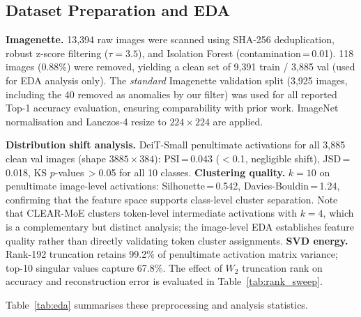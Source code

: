 \FloatBarrier
\subsection{Dataset Preparation and EDA}
\label{app:eda}

\textbf{Imagenette.} 13,394 raw images were scanned using SHA-256 deduplication, robust z-score filtering ($\tau{=}3.5$), and Isolation Forest (contamination\,=\,0.01). 118 images (0.88\%) were removed, yielding a clean set of 9,391 train / 3,885 val (used for EDA analysis only). The \emph{standard} Imagenette validation split (3,925 images, including the 40 removed as anomalies by our filter) was used for all reported Top-1 accuracy evaluation, ensuring comparability with prior work. ImageNet normalisation and Lanczos-4 resize to $224{\times}224$ are applied.

\textbf{Distribution shift analysis.} DeiT-Small penultimate activations for all 3,885 clean val images (shape $3885{\times}384$): PSI\,=\,0.043 ($<$0.1, negligible shift), JSD\,=\,0.018, KS $p$-values\,$>$0.05 for all 10 classes. \textbf{Clustering quality.} $k{=}10$ on penultimate image-level activations: Silhouette\,=\,0.542, Davies-Bouldin\,=\,1.24, confirming that the feature space supports class-level cluster separation. Note that CLEAR-MoE clusters token-level intermediate activations with $k{=}4$, which is a complementary but distinct analysis; the image-level EDA establishes feature quality rather than directly validating token cluster assignments. \textbf{SVD energy.} Rank-192 truncation retains 99.2\% of penultimate activation matrix variance; top-10 singular values capture 67.8\%. The effect of $W_2$ truncation rank on accuracy and reconstruction error is evaluated in Table~\ref{tab:rank_sweep}.

Table~\ref{tab:eda} summarises these preprocessing and analysis statistics.

\begin{table}[H]
\caption{Dataset preprocessing and EDA statistics.}
\label{tab:eda}
\centering
\small
{}
\end{table}


